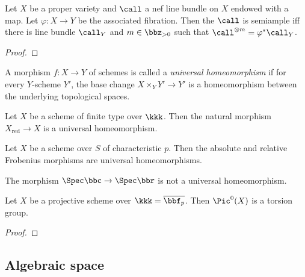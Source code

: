     \begin{proposition}\label{lem:fundamental_properties_of_EWM}
        Let \(X\) be a proper variety and \(\call\) a nef line bundle on \(X\) endowed with a map.
        Let \(\varphi: X \to Y\) be the associated fibration.
        Then the \(\call\) is semiample iff there is line bundle \(\call_Y\) and \(m \in \bbz_{>0}\) such that \(\call^{\otimes m} = \varphi^*\call_Y\).
    \end{proposition}
    \begin{proof}
    \end{proof}

    \begin{definition}\label{def:universally_homeomorphism}
        A morphism \(f: X \to Y\) of schemes is called a \emph{universal homeomorphism} 
        if for every \(Y\)-scheme \(Y'\), the base change \(X \times_Y Y' \to Y'\) is a homeomorphism between the underlying topological spaces.
    \end{definition}

    \begin{example}\label{eg:universal_homeomorphism}
        Let \(X\) be a scheme of finite type over \(\kkk\).
        Then the natural morphism \(X_{\text{red}} \to X\) is a universal homeomorphism.

        Let \(X\) be a scheme over \(S\) of characteristic \(p\).
        Then the absolute and relative Frobenius morphisms are universal homeomorphisms.

        The morphism \(\Spec \bbc \to \Spec \bbr\) is not a universal homeomorphism.
    \end{example}

    \begin{lemma}\label{lem:pic0_over_overline_bbf_p_is_torsion}
        Let \(X\) be a projective scheme over \(\kkk = \overline{\bbf_p}\).
        Then \(\Pic^0(X)\) is a torsion group.
    \end{lemma}
    \begin{proof}
    \end{proof}

\subsection{Algebraic space}

